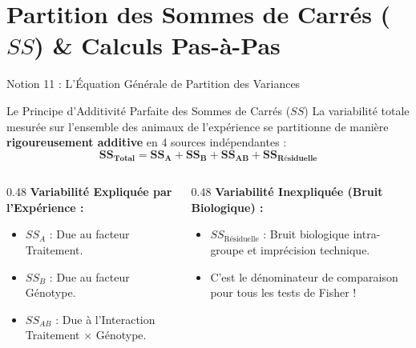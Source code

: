 \documentclass[aspectratio=169,10pt]{beamer}
\begin{document}
\section{Partition des Sommes de Carrés ($SS$) \& Calculs Pas-à-Pas}

\begin{frame}{Notion 11 : L'Équation Générale de Partition des Variances}
  \begin{conceptbox}{Le Principe d'Additivité Parfaite des Sommes de Carrés ($SS$)}
    La variabilité totale mesurée sur l'ensemble des animaux de l'expérience se partitionne de manière \textbf{rigoureusement additive} en 4 sources indépendantes :
    \begin{equation*}
      \mathbf{SS_{\text{Total}}} = \mathbf{SS_A} + \mathbf{SS_B} + \mathbf{SS_{AB}} + \mathbf{SS_{\text{Résiduelle}}}
    \end{equation*}
  \end{conceptbox}

  \begin{columns}[onlytextwidth, T]
    \begin{column}{0.48\linewidth}
      \textbf{\color{BioNavy}Variabilité Expliquée par l'Expérience :}
      \begin{itemize}
        \item $SS_A$ : Due au facteur Traitement.
        \item $SS_B$ : Due au facteur Génotype.
        \item $SS_{AB}$ : Due à l'Interaction Traitement $\times$ Génotype.
      \end{itemize}
    \end{column}
    \begin{column}{0.48\linewidth}
      \textbf{\color{BioAmber}Variabilité Inexpliquée (Bruit Biologique) :}
      \begin{itemize}
        \item $SS_{\text{Résiduelle}}$ : Bruit biologique intra-groupe et imprécision technique.
        \item C'est le dénominateur de comparaison pour tous les tests de Fisher !
      \end{itemize}
    \end{column}
  \end{columns}
\end{frame}
\end{document}
